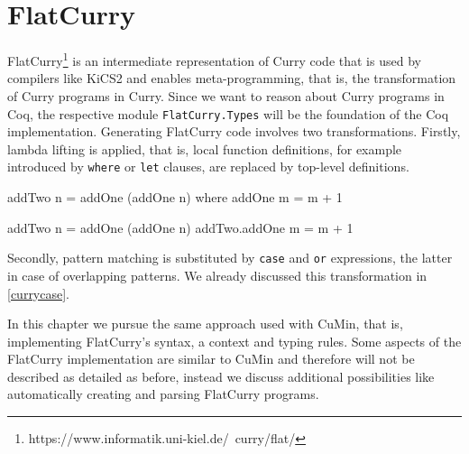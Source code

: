 \documentclass[paper = a4, fleqn, twoside]{scrreprt}
\begin{document}
\chapter{FlatCurry}
\label{flatcurry}
FlatCurry\footnote{https://www.informatik.uni-kiel.de/~curry/flat/} is an intermediate representation of Curry code that is used by compilers like KiCS2 and enables meta-programming, that is, the transformation of Curry programs in Curry. Since we want to reason about Curry programs in Coq, the respective module \texttt{FlatCurry.Types} will be the foundation of the Coq implementation. Generating FlatCurry code involves two transformations. Firstly, lambda lifting is applied, that is, local function definitions, for example introduced by \texttt{where} or \texttt{let} clauses, are replaced by top-level definitions.
\begin{flushleft}
\begin{minipage}{.3\linewidth}
\begin{haskellcode}
addTwo n = addOne (addOne n)
  where addOne m = m + 1
\end{haskellcode}
\end{minipage}
\hfill
\vrule
\hspace{.5em}
\begin{minipage}{.6\linewidth}
\begin{haskellcode}
addTwo n = addOne (addOne n)
addTwo.addOne m = m + 1
\end{haskellcode}
\end{minipage}
\end{flushleft}
Secondly, pattern matching is substituted by \texttt{case} and \texttt{or} expressions, the latter in case of overlapping patterns. We already discussed this transformation in \autoref{currycase}.\\
\par \noindent
In this chapter we pursue the same approach used with CuMin, that is, implementing FlatCurry's syntax, a context and typing rules. Some aspects of the FlatCurry implementation are similar to CuMin and therefore will not be described as detailed as before, instead we discuss additional possibilities like automatically creating and parsing FlatCurry programs.
\end{document}
